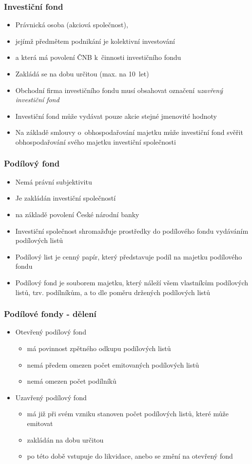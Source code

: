 \documentclass[xcolor=dvipsnames]{beamer}
\begin{document}
\begin{frame}
\frametitle{Investiční fond}
\begin{itemize} 
\item Právnická osoba (akciová společnost), 
\item jejímž předmětem podnikání je kolektivní investování 
\item a která má povolení ČNB k~činnosti investičního fondu
\item Zakládá se na dobu určitou (max. na 10~let)
\item Obchodní firma investičního fondu musí obsahovat označení \emph{uzavřený investiční fond}
\item Investiční fond může vydávat pouze akcie stejné jmenovité hodnoty
\item Na základě smlouvy o~obhospodařování majetku může investiční fond svěřit obhospodařování svého majetku investiční společnosti
\end{itemize} 
\end{frame}


\begin{frame}
\frametitle{Podílový fond}
\begin{itemize} 
\item Nemá právní subjektivitu
\item Je zakládán investiční společností
\item na základě povolení České národní banky
\item Investiční společnost shromažďuje prostředky do podílového fondu vydáváním podílových listů
\item Podílový list je cenný papír, který představuje podíl na majetku podílového fondu
\item Podílový fond je souborem majetku, který náleží všem vlastníkům podílových listů, tzv. podílníkům, a to dle poměru držených podílových listů  
\end{itemize} 
\end{frame}


\begin{frame}
\frametitle{Podílové fondy - dělení}
\begin{itemize}
  \item Otevřený podílový fond
    \begin{itemize}
      \item má povinnost zpětného odkupu podílových listů
      \item nemá předem omezen počet emitovaných podílových listů
      \item nemá omezen počet podílníků
     \end{itemize}
  \item Uzavřený podílový fond
    \begin{itemize}
     \item má již při svém vzniku stanoven počet podílových listů, které může emitovat
     \item zakládán na dobu určitou
     \item po této době vstupuje do likvidace, anebo se změní na otevřený fond
    \end{itemize}
\end{itemize}  
\end{frame}
\end{document}
